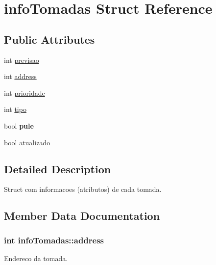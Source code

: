 \hypertarget{structinfo_tomadas}{}\section{info\+Tomadas Struct Reference}
\label{structinfo_tomadas}
\subsection*{Public Attributes}
\begin{DoxyCompactItemize}
\item 
int \hyperlink{structinfo_tomadas_add29a4ea588c1198cb91cf38f40b9451}{previsao}
\item 
int \hyperlink{structinfo_tomadas_a89c8e4b2c21a8478e2ff22778d5d9eca}{address}
\item 
int \hyperlink{structinfo_tomadas_ad89b1b21b89123c84749332412f8c59a}{prioridade}
\item 
int \hyperlink{structinfo_tomadas_a32cbb496aac12684a1365fd265bf6ff1}{tipo}
\item 
bool {\bfseries pule}\hypertarget{structinfo_tomadas_ad6f8da2829b836ad4cbb50a8fe47c466}{}\label{structinfo_tomadas_ad6f8da2829b836ad4cbb50a8fe47c466}

\item 
bool \hyperlink{structinfo_tomadas_acfb2f84158916a08581c25a776c11508}{atualizado}
\end{DoxyCompactItemize}


\subsection{Detailed Description}
Struct com informacoes (atributos) de cada tomada. 

\subsection{Member Data Documentation}
\subsubsection[{\texorpdfstring{address}{address}}]{\setlength{\rightskip}{0pt plus 5cm}int info\+Tomadas\+::address}\hypertarget{structinfo_tomadas_a89c8e4b2c21a8478e2ff22778d5d9eca}{}\label{structinfo_tomadas_a89c8e4b2c21a8478e2ff22778d5d9eca}
Endereco da tomada. 
